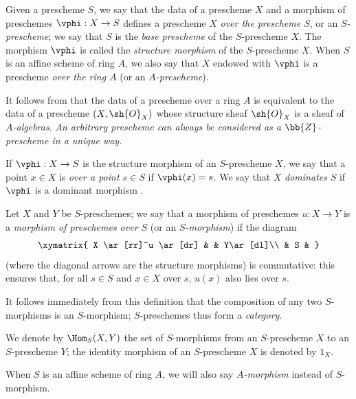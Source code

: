 \begin{definition}[2.5.1]
\label{I.2.5.1}
Given a prescheme $S$, we say that the data of a prescheme $X$ and a morphism of preschemes $\vphi:X\to S$ defines a prescheme $X$ \emph{over the prescheme $S$}, or an \emph{$S$-prescheme};
we say that $S$ is the \emph{base prescheme} of the $S$-prescheme $X$.
The morphism $\vphi$ is called the \emph{structure morphism} of the $S$-prescheme $X$.
When $S$ is an affine scheme of ring $A$, we also say that $X$ endowed with $\vphi$ is a prescheme \emph{over the ring $A$} (or an \emph{$A$-prescheme}).
\end{definition}

It follows from  that the data of a prescheme over a ring $A$ is equivalent to the data of a prescheme $(X,\sh{O}_X)$ whose structure sheaf $\sh{O}_X$ is a sheaf of \emph{$A$-algebras}.
\emph{An arbitrary prescheme can always be considered as a $\bb{Z}$-prescheme in a unique way}.

If $\vphi:X\to S$ is the structure morphism of an $S$-prescheme $X$, we
say that a point $x\in X$ is \emph{over a point $s\in S$} if $\vphi(x)=s$. We
say that $X$ \emph{dominates} $S$ if $\vphi$ is a dominant morphism .

\begin{env}[2.5.2]
\label{I.2.5.2}
Let $X$ and $Y$ be $S$-preschemes;
we say that a morphism of preschemes $u:X\to Y$ is a \emph{morphism of preschemes over $S$} (or an \emph{$S$-morphism}) if the diagram
\[
  \xymatrix{
    X \ar[rr]^u \ar[dr] & & Y\ar[dl]\\
    & S &
  }
\]
(where the diagonal arrows are the structure morphisms) is commutative: this ensures that, for all $s\in S$ and $x\in X$ over $s$, $u(x)$ also lies over $s$.
\end{env}

It follows immediately from this definition that the composition of any two $S$-morphisms is an $S$-morphism;
$S$-preschemes thus form a \emph{category}.

We denote by $\Hom_S(X,Y)$ the set of $S$-morphisms from an $S$-prescheme $X$ to an $S$-prescheme $Y$;
the identity morphism of an $S$-prescheme $X$ is denoted by $1_X$.

When $S$ is an affine scheme of ring $A$, we will also say \emph{$A$-morphism} instead of $S$-morphism.

